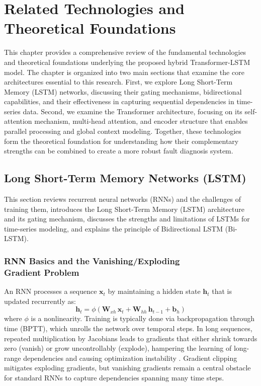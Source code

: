 \chapter{Related Technologies and Theoretical Foundations}
\label{cha:related_technologies}

This chapter provides a comprehensive review of the fundamental technologies and theoretical foundations underlying the proposed hybrid Transformer-LSTM model. The chapter is organized into two main sections that examine the core architectures essential to this research. First, we explore Long Short-Term Memory (LSTM) networks, discussing their gating mechanisms, bidirectional capabilities, and their effectiveness in capturing sequential dependencies in time-series data. Second, we examine the Transformer architecture, focusing on its self-attention mechanism, multi-head attention, and encoder structure that enables parallel processing and global context modeling. Together, these technologies form the theoretical foundation for understanding how their complementary strengths can be combined to create a more robust fault diagnosis system.

\section{Long Short-Term Memory Networks (LSTM)}
\label{sec:related_technologies:lstm}

This section reviews recurrent neural networks (RNNs) and the challenges of training them, introduces the Long Short-Term Memory (LSTM) architecture and its gating mechanism, discusses the strengths and limitations of LSTMs for time-series modeling, and explains the principle of Bidirectional LSTM (Bi-LSTM).

\subsection{RNN Basics and the Vanishing/Exploding\\ Gradient Problem}
An RNN processes a sequence \(\mathbf{x}_t\) by maintaining a hidden state \(\mathbf{h}_t\) that is updated recurrently as:
\begin{equation}
\mathbf{h}_t = \phi(\mathbf{W}_{xh}\,\mathbf{x}_t + \mathbf{W}_{hh}\,\mathbf{h}_{t-1} + \mathbf{b}_h)
\label{eq:rnn_update}
\end{equation}
where \(\phi\) is a nonlinearity. Training is typically done via backpropagation through time (BPTT), which unrolls the network over temporal steps. In long sequences, repeated multiplication by Jacobians leads to gradients that either shrink towards zero (vanish) or grow uncontrollably (explode), hampering the learning of long-range dependencies and causing optimization instability \cite{pascanu2013difficulty}. Gradient clipping mitigates exploding gradients, but vanishing gradients remain a central obstacle for standard RNNs to capture dependencies spanning many time steps.

